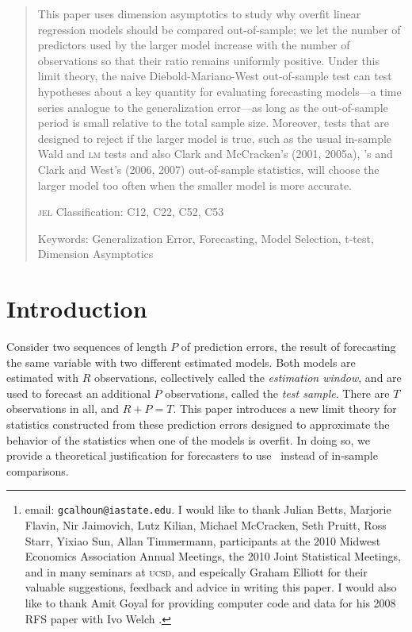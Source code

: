 \documentclass[11pt]{article}
\author{Gray Calhoun\thanks{email: \texttt{gcalhoun@iastate.edu}. I
    would like to thank Julian Betts, Marjorie Flavin, Nir Jaimovich,
    Lutz Kilian, Michael McCracken, Seth Pruitt, Ross Starr, Yixiao
    Sun, Allan Timmermann, participants at the 2010 Midwest Economics
    Association Annual Meetings, the 2010 Joint Statistical Meetings,
    and in many seminars at \textsc{ucsd}, and espeically Graham
    Elliott for their valuable suggestions, feedback and advice in
    writing this paper.  I would also like to thank Amit Goyal for
    providing computer code and data for his 2008 RFS paper with Ivo
    Welch \citep{goyal-welch-2008-rfs}.} \\ Iowa State University,
  Economics Department}
\newcommand{\citepos}[1]{\citeauthor{#1}'s \citeyearpar{#1}}
\begin{document}
\maketitle

\begin{abstract}\thispagestyle{empty}\noindent
  This paper uses dimension asymptotics to study why overfit linear
  regression models should be compared out-of-sample; we let the number of
  predictors used by the larger model increase with the number of
  observations so that their ratio remains uniformly positive.  Under
  this limit theory, the naive Diebold-Mariano-West out-of-sample test
  can test hypotheses about a key quantity for evaluating forecasting
  models---a time series analogue to the generalization error---as
  long as the out-of-sample period is small relative to the total
  sample size.  Moreover, tests that are designed to reject if the
  larger model is true, such as the usual in-sample Wald and
  \textsc{lm} tests and also Clark and McCracken's (2001, 2005a),
  \citepos{mccracken_asymptotics_2007} and Clark and West's (2006,
  2007) out-of-sample statistics, will choose the larger model too
  often when the smaller model is more accurate.

\noindent \textsc{jel} Classification: C12, C22, C52, C53

\noindent Keywords: Generalization Error, Forecasting, Model
Selection, t-test, Dimension Asymptotics
\end{abstract}

\section{Introduction}\label{sec:introduction}
Consider two sequences of length $P$ of prediction errors, the result
of forecasting the same variable with two different estimated models.
Both models are estimated with $R$ observations, collectively called
the {\em estimation window}, and are used to forecast an additional
$P$ observations, called the {\em test sample}.  There are $T$
observations in all, and $R+P=T$.  This paper introduces a new limit
theory for statistics constructed from these prediction errors
designed to approximate the behavior of the statistics when one of the
models is overfit.  In doing so, we provide a theoretical
justification for forecasters to use \oos\ instead of
in-sample comparisons.
\end{document}
